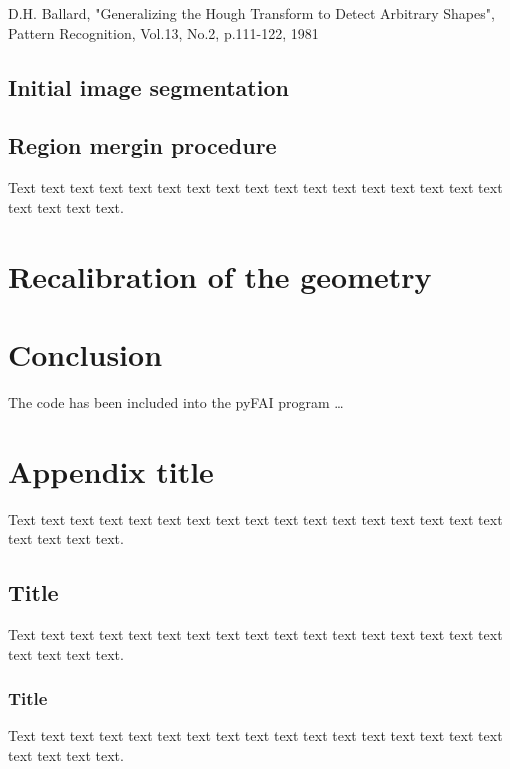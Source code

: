 \documentclass[preprint]{iucr}              %
\begin{document}
D.H. Ballard, "Generalizing the Hough Transform to Detect Arbitrary Shapes", Pattern Recognition, Vol.13, No.2, p.111-122, 1981

\subsection{Initial image segmentation}

\subsection{Region mergin procedure}

Text text text text text text text text text text text text text text
text text text text text text text.

\section{Recalibration of the geometry}

\section{Conclusion}
The code has been included into the pyFAI \cite{pyFAI_2015} program \ldots 






\appendix
\section{Appendix title}

Text text text text text text text text text text text text text text
text text text text text text text.

\subsection{Title}

Text text text text text text text text text text text text text text
text text text text text text text.

\subsubsection{Title}

Text text text text text text text text text text text text text text
text text text text text text text.


\end{document}
